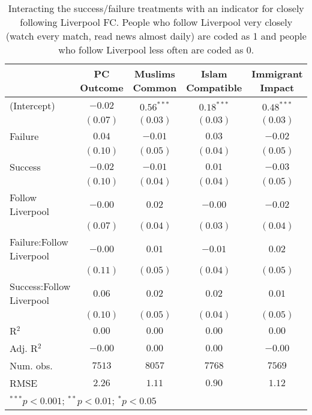 
\begin{table}[H]
\begin{center}
\begin{footnotesize}
\begin{tabular}{l c c c c}
\hline
 & PC Outcome & Muslims Common & Islam Compatible & Immigrant Impact \\
\hline
(Intercept)              & $-0.02$  & $0.56^{***}$ & $0.18^{***}$ & $0.48^{***}$ \\
                         & $(0.07)$ & $(0.03)$     & $(0.03)$     & $(0.03)$     \\
Failure                  & $0.04$   & $-0.01$      & $0.03$       & $-0.02$      \\
                         & $(0.10)$ & $(0.05)$     & $(0.04)$     & $(0.05)$     \\
Success                  & $-0.02$  & $-0.01$      & $0.01$       & $-0.03$      \\
                         & $(0.10)$ & $(0.04)$     & $(0.04)$     & $(0.05)$     \\
Follow Liverpool         & $-0.00$  & $0.02$       & $-0.00$      & $-0.02$      \\
                         & $(0.07)$ & $(0.04)$     & $(0.03)$     & $(0.04)$     \\
Failure:Follow Liverpool & $-0.00$  & $0.01$       & $-0.01$      & $0.02$       \\
                         & $(0.11)$ & $(0.05)$     & $(0.04)$     & $(0.05)$     \\
Success:Follow Liverpool & $0.06$   & $0.02$       & $0.02$       & $0.01$       \\
                         & $(0.10)$ & $(0.05)$     & $(0.04)$     & $(0.05)$     \\
\hline
R$^2$                    & $0.00$   & $0.00$       & $0.00$       & $0.00$       \\
Adj. R$^2$               & $-0.00$  & $0.00$       & $0.00$       & $-0.00$      \\
Num. obs.                & $7513$   & $8057$       & $7768$       & $7569$       \\
RMSE                     & $2.26$   & $1.11$       & $0.90$       & $1.12$       \\
\hline
\multicolumn{5}{l}{\tiny{$^{***}p<0.001$; $^{**}p<0.01$; $^{*}p<0.05$}}
\end{tabular}
\end{footnotesize}
\caption{Interacting the success/failure treatments with an indicator for closely following Liverpool FC. People who follow 
       Liverpool very closely (watch every match, read news almost daily) are coded as 1 and people who follow Liverpool 
       less often are coded as 0.}
\label{tab:success_follow}
\end{center}
\end{table}
